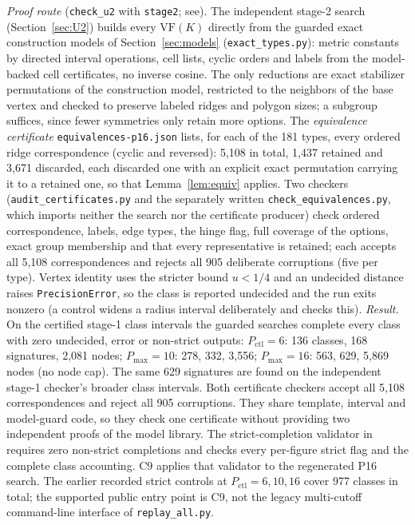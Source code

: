 \documentclass[11pt]{article}
\theoremstyle{definition}
\theoremstyle{remark}
\newcommand{\VF}{\mathrm{VF}}
\newcommand{\file}[1]{\path{#1}}
\begin{document}
\noindent\emph{Proof route} (\texttt{check\_u2} with \texttt{stage2}; see). The independent stage-2 search
(Section~\ref{sec:U2}) builds every $\VF(K)$ directly from the
guarded exact construction models of Section~\ref{sec:models}
(\texttt{exact\_types.py}): metric constants by directed interval
operations, cell lists, cyclic orders and labels from the model-backed
cell certificates, no inverse cosine. The only reductions are exact
stabilizer permutations of the construction model, restricted to the
neighbors of the base vertex and checked to preserve labeled ridges and
polygon sizes; a subgroup suffices, since fewer symmetries only retain more
options. The \emph{equivalence certificate}
\texttt{equivalences-p16.json} lists, for each of the 181 types, every
ordered ridge correspondence (cyclic and reversed): 5,108 in total, 1,437
retained and 3,671 discarded, each discarded one with an explicit exact
permutation carrying it to a retained one, so that Lemma~\ref{lem:equiv}
applies. Two checkers (\texttt{audit\_certificates.py} and the
separately written \texttt{check\_equivalences.py}, which imports
neither the search nor the certificate producer) check ordered
correspondence, labels, edge types, the hinge flag, full coverage of the
options, exact group membership and that every representative is retained;
each accepts all 5,108 correspondences and rejects all 905 deliberate
corruptions (five per type). Vertex identity uses the stricter bound
$u<1/4$ and an undecided distance raises \texttt{PrecisionError}, so the
class is reported undecided and the run exits nonzero (a control widens a
radius interval deliberately and checks this). \emph{Result.} On the
certified stage-1 class intervals the guarded searches complete every
class with zero undecided, error or non-strict outputs: $P_{\mathrm{ctl}}=6$: 136
classes, 168 signatures, 2,081 nodes; $P_{\max}=10$: 278, 332, 3,556;
$P_{\max}=16$: 563, 629, 5,869 nodes (no node cap). The same 629 signatures are found on the independent
stage-1 checker's broader class intervals. Both certificate checkers accept all 5,108 correspondences and reject
all 905 corruptions. They share template, interval and model-guard code,
so they check one certificate without providing two independent proofs
of the model library. The strict-completion validator in
\file{checks/primary/stage2/replay_all.py} requires zero non-strict
completions and checks every per-figure strict flag and the complete class
accounting. C9 applies that validator to the regenerated P16 search. The
earlier recorded strict controls at $P_{\mathrm{ctl}}=6,10,16$ cover 977
classes in total; the supported public entry point is C9, not the legacy
multi-cutoff command-line interface of \texttt{replay\_all.py}.
\end{document}

